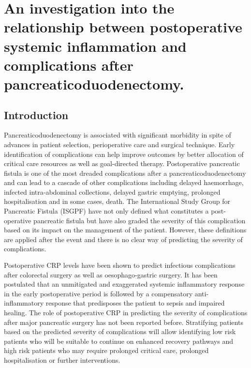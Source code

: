 
\chapter{An investigation into the relationship between postoperative systemic inflammation and complications after pancreaticoduodenectomy.}
\label{ch_survival}


\clearpage
\section{Introduction}
Pancreaticoduodenectomy is associated with significant morbidity in spite of advances in patient selection, perioperative care and surgical technique. Early identification of complications can help improve outcomes by better allocation of critical care resources as well as goal-directed therapy. Postoperative pancreatic fistula is one of the most dreaded complications after a pancreaticoduodenectomy and can lead to a cascade of other complications including delayed haemorrhage, infected intra-abdominal collections, delayed gastric emptying, prolonged hospitalisation and in some cases, death. The International Study Group for Pancreatic Fistula (ISGPF) have not only defined what constitutes a post-operative pancreatic fistula but have also graded the severity of this complication based on its impact on the management of the patient. However, these definitions are applied after the event and there is no clear way of predicting the severity of complications.

Postoperative CRP levels have been shown to predict infectious complications after colorectal surgery as well as oesophago-gastric surgery. It has been postulated that an unmitigated and exaggerated systemic inflammatory response in the early postoperative period is followed by a compensatory anti-inflammatory response that predisposes the patient to sepsis and impaired healing. The role of postoperative CRP in predicting the severity of complications after major pancreatic surgery has not been reported before. Stratifying patients based on the predicted severity of complications will allow identifying low risk patients who will be suitable to continue on enhanced recovery pathways and high risk patients who may require prolonged critical care, prolonged hospitalisation or further interventions.

